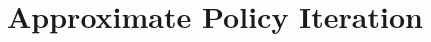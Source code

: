 \documentclass{article}
\DeclareMathOperator*{\1}{\mathbbm{1}}
\theoremstyle{definition}
\theoremstyle{remark}
\newcommand{\cS}{\mathcal{S}}
\begin{document}
%
%
%
%

\section*{Approximate Policy Iteration}
\end{document}
